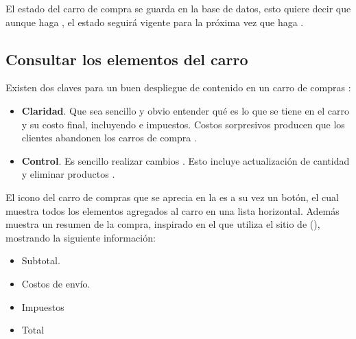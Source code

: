 		El estado del carro de compra se guarda en la base de datos, esto quiere decir que aunque haga \logoutCPT, el estado seguirá vigente para la próxima vez que haga \loginUpperCPT.


	\subsection{Consultar los elementos del carro}\label{chapter:section:carro_compra:subsection:request}



		Existen dos claves para un buen despliegue de contenido en un carro de compras \cite{online_official_conversionxl_checkout_flow}:
		\begin{itemize}
			\item
				\textbf{Claridad}. Que sea sencillo y obvio entender qué es lo que se tiene en el carro y su costo final, incluyendo \shipping e impuestos. Costos sorpresivos producen que los clientes abandonen los carros de compra \cite{online_official_conversionxl_checkout_flow}.
			\item
				\textbf{Control}. Es sencillo realizar cambios \cite{online_official_conversionxl_checkout_flow}. Esto incluye actualización de cantidad y eliminar productos \cite{online_official_conversionxl_shopping_cart_abandonment}.
		\end{itemize}

		El icono del carro de compras que se aprecia en la  es a su vez un botón, el cual muestra todos los elementos agregados al carro en una lista horizontal. Además muestra un resumen de la compra, inspirado en el que utiliza el sitio de \shopifyNAME (), mostrando la siguiente información: 
		\begin{itemize}
			\item
				Subtotal.
			\item
				Costos de envío.
			\item
				Impuestos
			\item
				Total
		\end{itemize}

